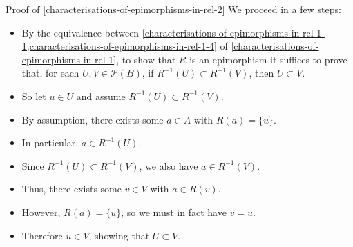 \begin{Proof}{Proof of \cref{characterisations-of-epimorphisms-in-rel-2}}
    We proceed in a few steps:
    \begin{itemize}
        \item By the equivalence between \cref{characterisations-of-epimorphisms-in-rel-1-1,characterisations-of-epimorphisms-in-rel-1-4} of \cref{characterisations-of-epimorphisms-in-rel-1}, to show that $R$ is an epimorphism it suffices to prove that, for each $U,V\in\mathcal{P}(B)$, if $R^{-1}(U)\subset R^{-1}(V)$, then $U\subset V$.
        \item So let $u\in U$ and assume $R^{-1}(U)\subset R^{-1}(V)$.
        \item By assumption, there exists some $a\in A$ with $R(a)=\{u\}$.
        \item In particular, $a\in R^{-1}(U)$.
        \item Since $R^{-1}(U)\subset R^{-1}(V)$, we also have $a\in R^{-1}(V)$.
        \item Thus, there exists some $v\in V$ with $a\in R(v)$.
        \item However, $R(a)=\{u\}$, so we must in fact have $v=u$.
        \item Therefore $u\in V$, showing that $U\subset V$.
    \end{itemize}


\end{Proof}
